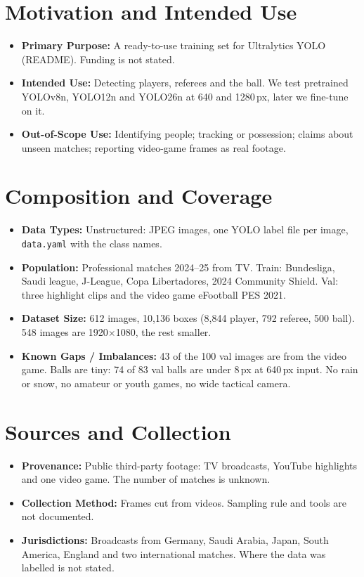 \documentclass[11pt, a4paper]{article}
\begin{document}
\section{Motivation and Intended Use}
\begin{itemize}
    \item \textbf{Primary Purpose:} A ready-to-use training set for Ultralytics YOLO (README). Funding is not stated.
    \item \textbf{Intended Use:} Detecting players, referees and the ball. We test pretrained YOLOv8n, YOLO12n and YOLO26n at 640 and 1280\,px, later we fine-tune on it.
    \item \textbf{Out-of-Scope Use:} Identifying people; tracking or possession; claims about unseen matches; reporting video-game frames as real footage.
\end{itemize}

\section{Composition and Coverage}
\begin{itemize}
    \item \textbf{Data Types:} Unstructured: JPEG images, one YOLO label file per image, \texttt{data.yaml} with the class names.
    \item \textbf{Population:} Professional matches 2024--25 from TV. Train: Bundesliga, Saudi league, J-League, Copa Libertadores, 2024 Community Shield. Val: three highlight clips and the video game eFootball PES 2021.
    \item \textbf{Dataset Size:} 612 images, 10,136 boxes (8,844 player, 792 referee, 500 ball). 548 images are 1920$\times$1080, the rest smaller.
    \item \textbf{Known Gaps / Imbalances:} 43 of the 100 val images are from the video game. Balls are tiny: 74 of 83 val balls are under 8\,px at 640\,px input. No rain or snow, no amateur or youth games, no wide tactical camera.
\end{itemize}

\section{Sources and Collection}
\begin{itemize}
    \item \textbf{Provenance:} Public third-party footage: TV broadcasts, YouTube highlights and one video game. The number of matches is unknown.
    \item \textbf{Collection Method:} Frames cut from videos. Sampling rule and tools are not documented.
    \item \textbf{Jurisdictions:} Broadcasts from Germany, Saudi Arabia, Japan, South America, England and two international matches. Where the data was labelled is not stated.
\end{itemize}
\end{document}

